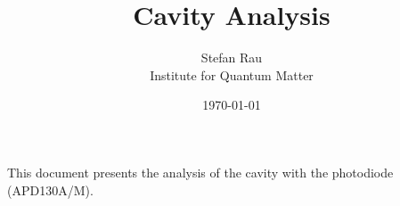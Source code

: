 \documentclass[a4paper,11pt]{article}
\title{Cavity Analysis}
\author{Stefan Rau \\ Institute for Quantum Matter}
\date{\today}
\begin{document}
\maketitle
\tableofcontents
\newpage
\begin{center}
    \vspace{5cm}
    This document presents the analysis of the cavity with the photodiode (APD130A/M).
\end{center}
\newpage

\newpage

\newpage

\newpage

\newpage

\newpage

\newpage

\newpage

\end{document}
